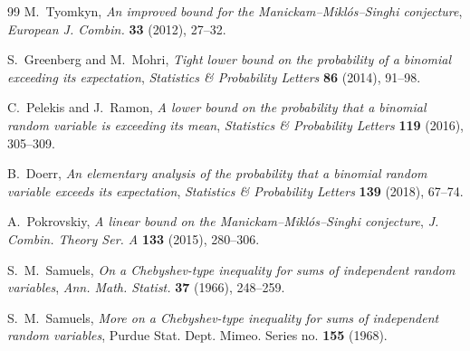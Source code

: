 \documentclass[11pt]{amsart}
\theoremstyle{definition}
\begin{document}
\begin{thebibliography}{99}
M.~Tyomkyn,
\emph{An improved bound for the Manickam--Mikl\'os--Singhi conjecture},
\emph{European J. Combin.} \textbf{33} (2012), 27--32.

S.~Greenberg and M.~Mohri,
\emph{Tight lower bound on the probability of a binomial exceeding its expectation},
\emph{Statistics \& Probability Letters} \textbf{86} (2014), 91--98.

C.~Pelekis and J.~Ramon,
\emph{A lower bound on the probability that a binomial random variable is exceeding its mean},
\emph{Statistics \& Probability Letters} \textbf{119} (2016), 305--309.

B.~Doerr,
\emph{An elementary analysis of the probability that a binomial random variable exceeds its expectation},
\emph{Statistics \& Probability Letters} \textbf{139} (2018), 67--74.

A.~Pokrovskiy,
\emph{A linear bound on the Manickam--Mikl\'os--Singhi conjecture},
\emph{J. Combin. Theory Ser. A} \textbf{133} (2015), 280--306.

S.~M.~Samuels,
\emph{On a Chebyshev-type inequality for sums of independent random variables},
\emph{Ann. Math. Statist.} \textbf{37} (1966), 248--259.

S.~M.~Samuels,
\emph{More on a Chebyshev-type inequality for sums of independent random variables},
Purdue Stat. Dept. Mimeo. Series no. \textbf{155} (1968).

\end{thebibliography}
\end{document}
